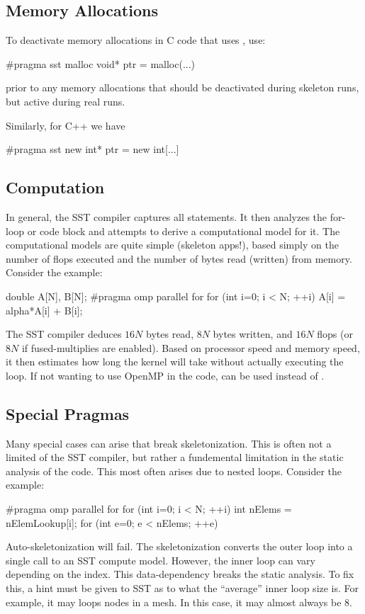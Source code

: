 \subsection{Memory Allocations}
To deactivate memory allocations in C code that uses , use:
\begin{CppCode}
#pragma sst malloc
  void* ptr = malloc(...)
\end{CppCode}
prior to any memory allocations that should be deactivated during skeleton runs, but active during real runs.

Similarly, for C++ we have
\begin{CppCode}
#pragma sst new
  int* ptr = new int[...]
\end{CppCode}

\subsection{Computation}
In general, the SST compiler captures all  statements.
It then analyzes the for-loop or code block and attempts to derive a computational model for it.
The computational models are quite simple (skeleton apps!), 
based simply on the number of flops executed and the number of bytes read (written) from memory.
Consider the example:

\begin{CppCode}
double A[N], B[N];
#pragma omp parallel for
for (int i=0; i < N; ++i){
  A[i] = alpha*A[i] + B[i];
}
\end{CppCode}
The SST compiler deduces $16N$ bytes read, $8N$ bytes written, and $16N$ flops (or $8N$ if fused-multiplies are enabled).
Based on processor speed and memory speed, it then estimates how long the kernel will take without actually executing the loop.
If not wanting to use OpenMP in the code,  can be used instead of .


\subsection{Special Pragmas}
Many special cases can arise that break skeletonization.
This is often not a limited of the SST compiler, but rather a fundemental limitation in the static analysis of the code.
This most often arises due to nested loops. Consider the example:

\begin{CppCode}
#pragma omp parallel for
for (int i=0; i < N; ++i){
  int nElems = nElemLookup[i];
  for (int e=0; e < nElems; ++e){
  }
}
\end{CppCode}
Auto-skeletonization will fail. The skeletonization converts the outer loop into a single call to an SST compute model.
However, the inner loop can vary depending on the index.
This data-dependency breaks the static analysis.
To fix this, a hint must be given to SST as to what the ``average'' inner loop size is.
For example, it may loops nodes in a mesh. In this case, it may almost always be 8.

